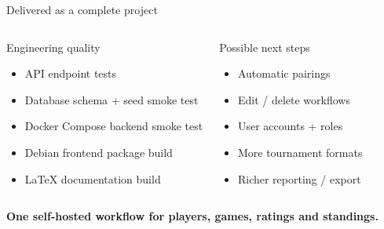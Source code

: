 \documentclass[aspectratio=169,11pt]{beamer}
\newcommand{\bigidea}[1]{\begin{center}\color{thgablue}\bfseries\Large #1\end{center}}
\begin{document}
\begin{frame}{Delivered as a complete project}
\vspace{0.2cm}
\begin{columns}[T,onlytextwidth]
  \begin{block}{Engineering quality}
    \small
    \begin{itemize}\setlength\itemsep{0.35em}
      \item API endpoint tests
      \item Database schema + seed smoke test
      \item Docker Compose backend smoke test
      \item Debian frontend package build
      \item LaTeX documentation build
    \end{itemize}
  \end{block}
  \begin{block}{Possible next steps}
    \small
    \begin{itemize}\setlength\itemsep{0.35em}
      \item Automatic pairings
      \item Edit / delete workflows
      \item User accounts + roles
      \item More tournament formats
      \item Richer reporting / export
    \end{itemize}
  \end{block}
\end{columns}
\vspace{0.28cm}
\bigidea{One self-hosted workflow for players, games, ratings and standings.}
\end{frame}
\end{document}
